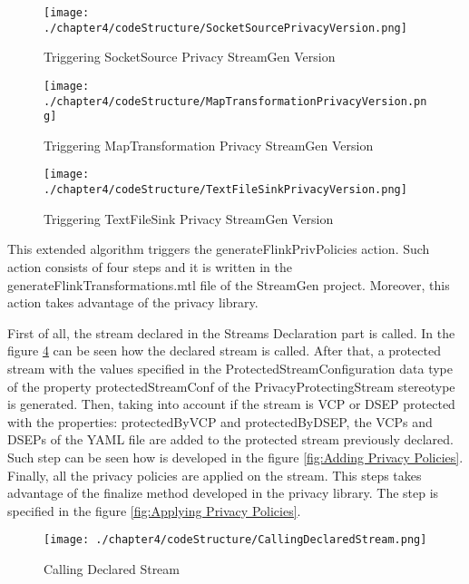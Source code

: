 \begin{figure}
\centering
{\texttt{[image: ./chapter4/codeStructure/SocketSourcePrivacyVersion.png]}}
\caption{Triggering SocketSource Privacy StreamGen Version}
\label{fig:Triggering SocketSource Privacy StreamGen Version}
\end{figure}

\begin{figure}
\centering
{\texttt{[image: ./chapter4/codeStructure/MapTransformationPrivacyVersion.png]}}
\caption{Triggering MapTransformation Privacy StreamGen Version}
\label{fig:Triggering MapTransformation Privacy StreamGen Version}
\end{figure}

\begin{figure}
\centering
{\texttt{[image: ./chapter4/codeStructure/TextFileSinkPrivacyVersion.png]}}
\caption{Triggering TextFileSink Privacy StreamGen Version}
\label{fig:Triggering TextFileSink Privacy StreamGen Version}
\end{figure}

This extended algorithm triggers the generateFlinkPrivPolicies action. Such action consists of four steps and it is written in the generateFlinkTransformations.mtl file of the StreamGen project. Moreover, this action takes advantage of the privacy library.

First of all, the stream declared in the Streams Declaration part is called. In the figure \ref{fig:Calling Declared Stream} can be seen how the declared stream is called. After that, a protected stream with the values specified in the ProtectedStreamConfiguration data type of the property protectedStreamConf of the PrivacyProtectingStream stereotype is generated. Then, taking into account if the stream is VCP or DSEP protected with the properties: protectedByVCP and protectedByDSEP, the VCPs and DSEPs of the YAML file are added to the protected stream previously declared. Such step can be seen how is developed in the figure \ref{fig:Adding Privacy Policies}. Finally, all the privacy policies are applied on the stream. This steps takes advantage of the finalize method developed in the privacy library. The step is specified in the figure \ref{fig:Applying Privacy Policies}.

\begin{figure}
\centering
{\texttt{[image: ./chapter4/codeStructure/CallingDeclaredStream.png]}}
\caption{Calling Declared Stream}
\label{fig:Calling Declared Stream}
\end{figure}

